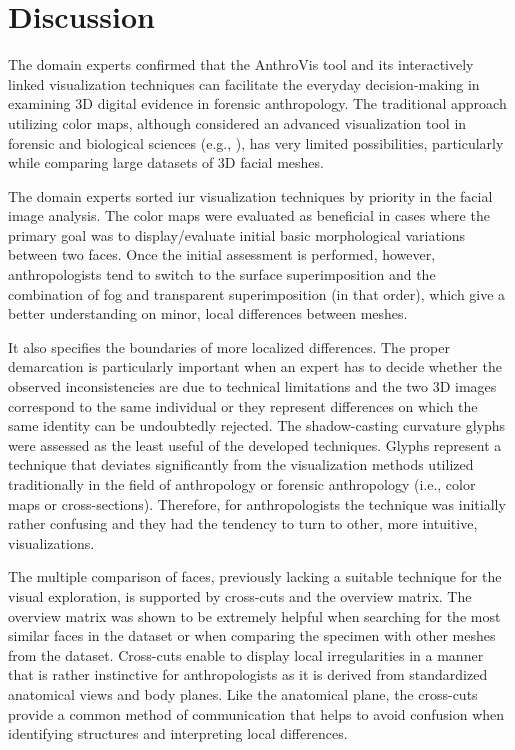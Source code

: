 \documentclass[final,5p,times]{elsarticle}
\begin{document}
\section{Discussion} \label{discussion}
The domain experts confirmed that the AnthroVis tool and its interactively linked visualization techniques can facilitate the everyday decision-making in examining 3D digital evidence in forensic anthropology. 
The traditional approach utilizing color maps, although considered an advanced visualization tool in forensic and biological sciences (e.g., \cite{urbanova2015testing}), has very limited possibilities, particularly while comparing large datasets of 3D facial meshes.

The domain experts sorted iur visualization techniques by priority in the facial image analysis. 
The color maps were evaluated as beneficial in cases where the primary goal was to display/evaluate initial basic morphological variations between two faces. 
Once the initial assessment is performed, however, anthropologists tend to switch to the surface superimposition and the combination of fog and transparent superimposition (in that order), which give a better understanding on minor, local differences between meshes. 

It also specifies the boundaries of more localized differences. 
The proper demarcation is particularly important when an expert has to decide whether the observed inconsistencies are due to technical limitations and the two 3D images correspond to the same individual or they represent differences on which the same identity can be undoubtedly rejected. 
The shadow-casting curvature glyphs were assessed as the least useful of the developed techniques. 
Glyphs represent a technique that deviates significantly from the visualization methods utilized traditionally in the field of anthropology or forensic anthropology (i.e., color maps or cross-sections). 
Therefore, for anthropologists the technique was initially rather confusing and they had the tendency to turn to other, more intuitive, visualizations. 
 
The multiple comparison of faces, previously lacking a suitable technique for the visual exploration, is supported by cross-cuts and the overview matrix. 
The overview matrix was shown to be extremely helpful when searching for the most similar faces in the dataset or when comparing the specimen with other meshes from the dataset. 
Cross-cuts enable to display local irregularities in a manner that is rather instinctive for anthropologists as it is derived from standardized anatomical views and body planes. 
Like the anatomical plane, the cross-cuts provide a common method of communication that helps to avoid confusion when identifying structures and interpreting local differences.
\end{document}
